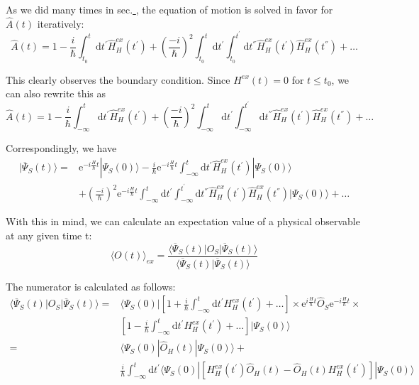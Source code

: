 As we did many times in sec.\underline{    }, the equation of motion is solved in favor for $\hat{A}(t)$ iteratively:
\[ \hat{A}(t) = 1-\frac{i}{\hbar} \int_{t_0}^{t} \mathrm{d} t^{'} \hat{H}_{H}^{ex}(t^{'}) + \left( \frac{-i}{\hbar} \right)^2 \int_{t_0}^{t} \mathrm{d} t^{'} \int_{t_0}^{t^{'}} \mathrm{d} t^{''} \hat{H}_H^{ex}(t^{'}) \hat{H}_H^{ex}(t^{''}) + \ldots \]

This clearly observes the boundary condition. Since $H^{ex}(t) = 0$ for $t \leq t_0$, we can also rewrite this as
\begin{equation} \label{Eqs3.1.5}
\hat{A}(t) = 1-\frac{i}{\hbar} \int_{-\infty}^{t} \mathrm{d} t^{'} \hat{H}_{H}^{ex}(t^{'}) + \left( \frac{-i}{\hbar} \right)^2 \int_{-\infty}^{t} \mathrm{d} t^{'} \int_{-\infty}^{t^{'}} \mathrm{d} t^{''} \hat{H}_H^{ex}(t^{'}) \hat{H}_H^{ex}(t^{''}) + \ldots
\end{equation}

Correspondingly, we have
\begin{equation*} \label{Eqs3.1.5'} \tag{3.1.5'} \begin{split}
| \overline{\Psi}_S(t) \rangle =& \mathrm{e}^{-i \frac{H}{\hbar} t} | \Psi_S(0) \rangle - \frac{i}{\hbar}\mathrm{e}^{-i \frac{H}{\hbar}t} \int_{-\infty}^{t} \mathrm{d} t^{'} \hat{H}_{H}^{ex}(t^{'}) | \Psi_S(0) \rangle \\
&+ \left( \frac{-i}{\hbar} \right)^2 \mathrm{e}^{-i \frac{H}{\hbar}t} \int_{-\infty}^{t} \mathrm{d} t^{'} \int_{-\infty}^{t^{'}} \mathrm{d} t^{''} \hat{H}_H^{ex}(t^{'}) \hat{H}_H^{ex}(t^{''}) | \Psi_S(0) \rangle + \ldots
\end{split}\end{equation*}

With this in mind, we can calculate an expectation value of a physical observable at any given time t:
\begin{equation} \label{Eqs3.1.6}
\langle O(t) \rangle_{ex} = \frac{\langle \overline{\Psi}_S(t)|O_S|\overline{\Psi}_S(t)\rangle}{\langle \overline{\Psi}_S(t)|\overline{\Psi}_S(t)\rangle}
\end{equation}

The numerator is calculated as follows:
\begin{equation} \label{Eqs3.1.7}\begin{split}
\langle \overline{\Psi}_S(t)|O_S|\overline{\Psi}_S(t)\rangle = & \langle \Psi_S(0) | \left[ 1 + \frac{i}{\hbar}\int_{-\infty}^{t} \mathrm{d} t^{'} H_H^{ex}(t^{'}) + \ldots \right] \times \mathrm{e}^{i \frac{H}{\hbar} t} \hat{O}_S \mathrm{e}^{-i \frac{H}{\hbar} t} \times \\
&\left[ 1 - \frac{i}{\hbar}\int_{-\infty}^{t} \mathrm{d} t^{'} H_H^{ex}(t^{'}) + \ldots \right] | \Psi_S(0) \rangle\\
=&\langle \Psi_S(0)|\hat{O}_H(t)|\Psi_S(0)\rangle +\\
& \frac{i}{\hbar} \int_{-\infty}^{t} \mathrm{d} t^{'} \langle \Psi_S(0) | \left[ H_H^{ex}(t^{'})\hat{O}_H(t) - \hat{O}_H(t)H_H^{ex}(t^{'}) \right] | \Psi_S(0) \rangle
\end{split}\end{equation}

